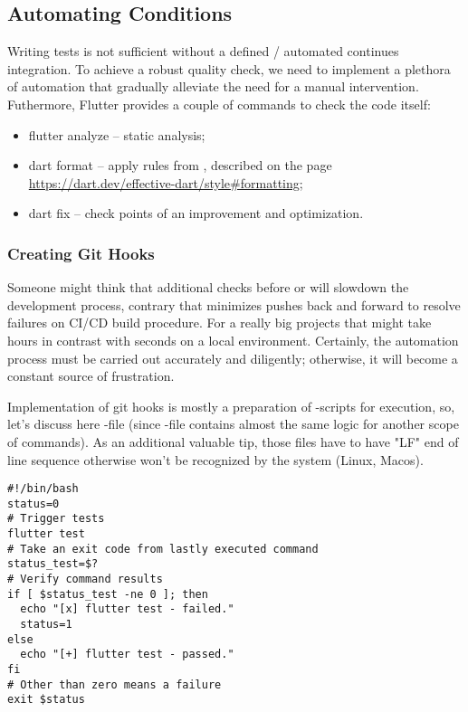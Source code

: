 
\newpage
\subsection{Automating Conditions}

Writing tests is not sufficient without a defined / automated continues integration. To achieve a robust quality check,
we need to implement a plethora of automation that gradually alleviate the need for a manual intervention. Futhermore,
Flutter provides a couple of commands to check the code itself:

\begin{itemize}
  \item flutter analyze -- static analysis;
  \item dart format -- apply rules from , described on the page
  \href{https://dart.dev/effective-dart/style\#formatting}{https://dart.dev/effective-dart/style\#formatting};
  \item dart fix -- check points of an improvement and optimization.
\end{itemize}


\subsubsection{Creating Git Hooks}

Someone might think that additional checks before  or  will slowdown the development process,
contrary that minimizes pushes back and forward to resolve failures on CI/CD build procedure. For a really big projects
that might take hours in contrast with seconds on a local environment. Certainly, the automation process must be
carried out accurately and diligently; otherwise, it will become a constant source of frustration.

Implementation of git hooks is mostly a preparation of -scripts for execution, so, let's discuss here
-file (since -file contains almost the same logic for another scope of commands). As an
additional valuable tip, those files have to have "LF" end of line sequence otherwise won't be recognized by the system
(Linux, Macos).

\begin{lstlisting}[language=terminal]
#!/bin/bash
status=0
# Trigger tests
flutter test
# Take an exit code from lastly executed command
status_test=$?
# Verify command results
if [ $status_test -ne 0 ]; then
  echo "[x] flutter test - failed."
  status=1
else
  echo "[+] flutter test - passed."
fi
# Other than zero means a failure
exit $status
\end{lstlisting}

